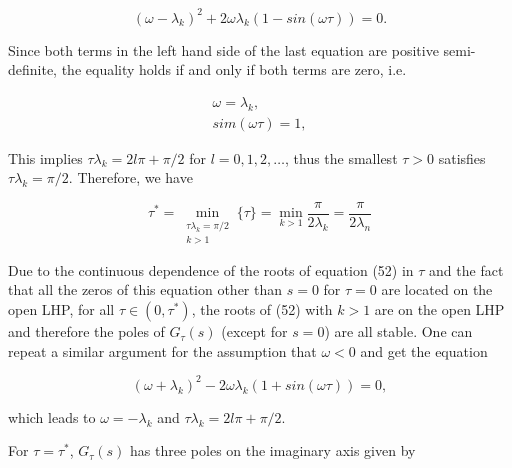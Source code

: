 \documentclass{article}
\begin{document}
\begin{equation}
    \tag{59}
    \label{59}
    (\omega-\lambda_k)^2 + 2\omega\lambda_k(1-sin(\omega\tau)) = 0.
\end{equation}

{\color[gray]{0.5}
\noindent Since both terms in the left hand side of the last equation are positive semi-deﬁnite, the equality holds if and only if both terms are zero, i.e.
}

\begin{equation}
    \tag{60}
    \label{60}
    \begin{aligned}
        \omega = \lambda_k,\\
        sim(\omega\tau) = 1,
    \end{aligned}
\end{equation}

{\color[gray]{0.5}
\noindent This implies $\tau\lambda_k = 2l\pi + \pi/2$ for $l=0,1,2,\dots$, thus the smallest $\tau>0$ satisfies $\tau\lambda_k=\pi/2$. 
Therefore, we have
}



\begin{equation}
    \tag{61}
    \label{61}
    \tau^* = \min_{\substack{\tau\lambda_k=\pi/2\\k>1}}\{\tau\} = \min_{k>1}\frac{\pi}{2\lambda_k}=\frac{\pi}{2\lambda_n}
\end{equation}

{\color[gray]{0.5}
\noindent Due to the continuous dependence of the roots of equation (52) in $\tau$ and the fact that all the zeros of this equation other than $s=0$ for $\tau=0$ are located on the open LHP, for all $\tau\in(0, \tau^*)$, the roots of (52) with $k>1$ are on the open LHP and therefore the poles of $G_{\tau}(s)$ (except for $s=0$) are all stable. 
One can repeat a similar argument for the assumption that $\omega<0$ and get the equation
}



\begin{equation}
    \tag{62}
    \label{62}
    (\omega+\lambda_k)^2 - 2\omega\lambda_k(1+sin(\omega\tau))=0,
\end{equation}

{\color[gray]{0.5}
\noindent which leads to $\omega=-\lambda_k$ and $\tau\lambda_k = 2l\pi + \pi/2$. 
}



{\color[gray]{0.5}
For $\tau=\tau^*$, $G_{\tau}(s)$ has three poles on the imaginary axis given by 
}
\end{document}
